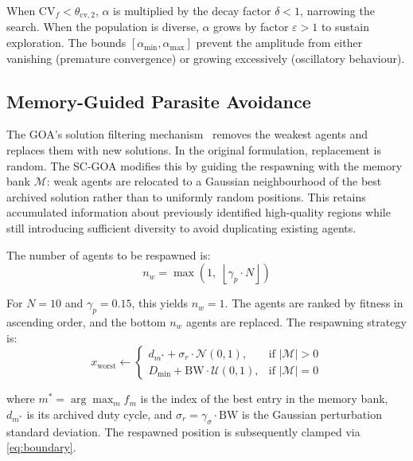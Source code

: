 \documentclass[a4paper, 12pt]{article}
\begin{document}
When $\mathrm{CV}_f < \theta_{\mathrm{cv},2}$, $\alpha$ is multiplied by the decay factor $\delta < 1$, narrowing the search. When the population is diverse, $\alpha$ grows by factor $\varepsilon > 1$ to sustain exploration. The bounds $[\alpha_{\min}, \alpha_{\max}]$ prevent the amplitude from either vanishing (premature convergence) or growing excessively (oscillatory behaviour).


\subsection{Memory-Guided Parasite Avoidance}
\label{subsec:parasite}

The GOA's solution filtering mechanism~\cite{nozari2025goa} removes the weakest agents and replaces them with new solutions. In the original formulation, replacement is random. The SC-GOA modifies this by guiding the respawning with the memory bank $\mathcal{M}$: weak agents are relocated to a Gaussian neighbourhood of the best archived solution rather than to uniformly random positions. This retains accumulated information about previously identified high-quality regions while still introducing sufficient diversity to avoid duplicating existing agents.

The number of agents to be respawned is:
\begin{equation}
    n_w = \max\!\left(1,\; \left\lfloor \gamma_p \cdot N \right\rfloor\right)
    \label{eq:num_worst}
\end{equation}

For $N = 10$ and $\gamma_p = 0.15$, this yields $n_w = 1$. The agents are ranked by fitness in ascending order, and the bottom $n_w$ agents are replaced. The respawning strategy is:
\begin{equation}
    x_{\text{worst}} \leftarrow
    \begin{cases}
        d_{m^{*}} + \sigma_r \cdot \mathcal{N}(0,1), & \text{if } |\mathcal{M}| > 0 \\[4pt]
        D_{\min} + \mathrm{BW} \cdot \mathcal{U}(0,1), & \text{if } |\mathcal{M}| = 0
    \end{cases}
    \label{eq:parasite}
\end{equation}

where $m^{*} = \arg\max_{m} f_m$ is the index of the best entry in the memory bank, $d_{m^{*}}$ is its archived duty cycle, and $\sigma_r = \gamma_\sigma \cdot \mathrm{BW}$ is the Gaussian perturbation standard deviation. The respawned position is subsequently clamped via \cref{eq:boundary}.
\end{document}
